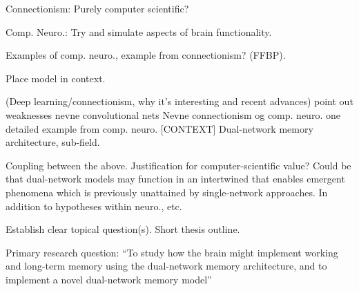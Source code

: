 Connectionism: Purely computer scientific?

Comp. Neuro.: Try and simulate aspects of brain functionality.

Examples of comp. neuro., example from connectionism? (FFBP).

Place model in context.



(Deep learning/connectionism, why it’s interesting and recent advances)
point out weaknesses
nevne convolutional nets
Nevne connectionism og comp. neuro.
one detailed example from comp. neuro. [CONTEXT]
Dual-network memory architecture, sub-field.

Coupling between the above. Justification for computer-scientific value? 
Could be that dual-network models may function in an intertwined that enables emergent phenomena which is previously unattained by single-network approaches. In addition to hypotheses within neuro., etc.

Establish clear topical question(s).
Short thesis outline.

Primary research question: “To study how the brain might implement working and long-term memory using the dual-network memory architecture, and to implement a novel dual-network memory model”


\cleardoublepage